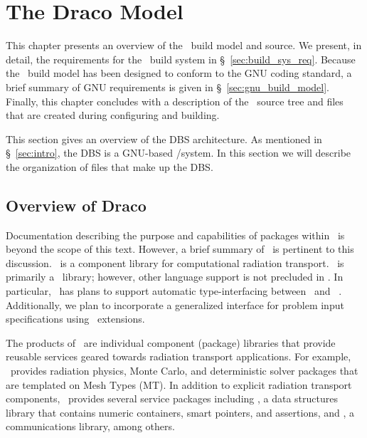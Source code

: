 
\chapter{The Draco Model}
\label{chap:model}

This chapter presents an overview of the \draco\ build model and
source.  We present, in detail, the requirements for the \draco\ build
system in \S~\ref{sec:build_sys_req}.  Because the \draco\ build model
has been designed to conform to the GNU coding standard, a brief
summary of GNU requirements is given in \S~\ref{sec:gnu_build_model}.
Finally, this chapter concludes with a description of the \draco\ 
source tree and files that are created during configuring and
building.

This section gives an overview of the DBS architecture.  As mentioned
in \S~\ref{sec:intro}, the DBS is a GNU-based \autoconf/\make system.
In this section we will describe the organization of files that make
up the DBS.


\section{Overview of Draco}
\label{sec:overview_of_draco}

Documentation describing the purpose and capabilities of packages
within \draco\ is beyond the scope of this text.  However, a brief
summary of \draco\ is pertinent to this discussion.  \draco\ is a
component library for computational radiation transport.  \draco\ is
primarily a \cpp\ library; however, other language support is not
precluded in \draco.  In particular, \draco\ has plans to support
automatic type-interfacing between \cpp\ and \fortran~\cite{gr99}.
Additionally, we plan to incorporate a generalized interface for
problem input specifications using \python\ extensions.

The products of \draco\ are individual component (package) libraries
that provide reusable services geared towards radiation transport
applications.  For example, \draco\ provides radiation physics, Monte
Carlo, and deterministic solver packages that are templated on Mesh
Types (MT).  In addition to explicit radiation transport components,
\draco\ provides several service packages including \dsxx, a data
structures library that contains numeric containers, smart pointers,
and assertions, and \cfour, a communications library, among others.

